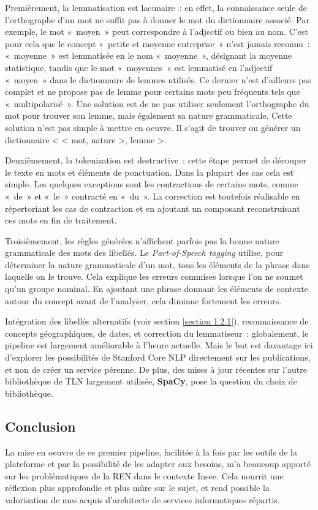 Premièrement, la lemmatisation est lacunaire~: en effet, la connaissance seule de l'orthographe d'un mot ne suffit pas à donner le mot du dictionnaire associé. Par exemple, le mot «~moyen~» peut correspondre à l'adjectif ou bien au nom. C'est pour cela que le concept «~petite et moyenne entreprise~» n'est jamais reconnu~: «~moyenne~» est lemmatisée en le nom «~moyenne~», désignant la moyenne statistique, tandis que le mot «~moyennes~» est lemmatisé en l'adjectif «~moyen~» dans le dictionnaire de lemmes utilisés. Ce dernier n'est d'ailleurs pas complet et ne propose pas de lemme pour certains mots peu fréquents tels que «~multipolarisé~». Une solution est de ne pas utiliser seulement l'orthographe du mot pour trouver son lemme, mais également sa nature grammaticale. Cette solution n'est pas simple à mettre en oeuvre. Il s'agit de trouver ou générer un dictionnaire < < mot, nature >, lemme >.
\newline

Deuxièmement, la tokenization est destructive~: cette étape permet de découper le texte en mots et éléments de ponctuation. Dans la plupart des cas cela est simple. Les quelques exceptions sont les contractions de certains mots, comme «~de~» et «~le~» contracté en «~du~». La correction est toutefois réalisable en répertoriant les cas de contraction et en ajoutant un composant reconstruisant ces mots en fin de traitement.
\newline

Troisièmement, les règles générées n'affichent parfois pas la bonne nature grammaticale des mots des libellés. Le \textit{Part-of-Speech tagging} utilise, pour déterminer la nature grammaticale d'un mot, tous les éléments de la phrase dans laquelle on le trouve. Cela explique les erreurs commises lorsque l'on ne soumet qu'un groupe nominal. En ajoutant une phrase donnant les éléments de contexte autour du concept avant de l'analyser, cela diminue fortement les erreurs.
\newline

Intégration des libellés alternatifs (voir section \ref{section 1.2.1}), reconnaissance de concepts géographiques, de dates, et correction du lemmatiseur~: globalement, le pipeline est largement améliorable à l'heure actuelle. Mais le but est davantage ici d'explorer les possibilités de Stanford Core NLP directement sur les publications, et non de créer un service pérenne. De plus, des mises à jour récentes sur l'autre bibliothèque de TLN largement utilisée, \textbf{SpaCy}, pose la question du choix de bibliothèque.
\label{section 2.2.5}

\subsection*{Conclusion}
La mise en oeuvre de ce premier pipeline, facilitée à la fois par les outils de la plateforme et par la possibilité de les adapter aux besoins, m'a beaucoup apporté sur les problématiques de la REN dans le contexte Insee. Cela nourrit une réflexion plus approfondie et plus mûre sur le sujet, et rend possible la valorisation de mes acquis d'architecte de services informatiques répartis.
